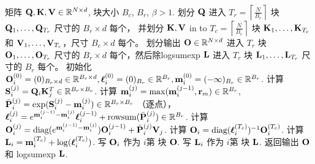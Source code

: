 \documentclass{article} %
\begin{document}
\begin{algorithm}[h!]
  \caption{通过缓解有偏舍入误差的稳定化 Flash Attention：前向过程}\label{alg:SFA}
  \begin{algorithmic}[1]
    \REQUIRE 矩阵 ${\mathbf{Q}}, {\mathbf{K}}, {\mathbf{V}} \in \mathbb{R}^{N \times d}$, 块大小 $B_c$, $B_r$, $\beta>1$.
    \STATE 划分 ${\mathbf{Q}}$ 进入 $T_r = \left\lceil\frac{N}{B_r} \right\rceil$ 块 ${\mathbf{Q}}_1, \dots, {\mathbf{Q}}_{T_r}$ 尺寸的 $B_r \times d$ 每个，
    并划分 ${\mathbf{K}}, {\mathbf{V}}$ in to $T_c = \left\lceil \frac{N}{B_c} \right\rceil$ 块 ${\mathbf{K}}_1, \dots, {\mathbf{K}}_{T_c}$ 和
    ${\mathbf{V}}_1, \dots, {\mathbf{V}}_{T_c}$，尺寸 $B_c \times d$ 每个。
    \STATE 划分输出 ${\mathbf{O}} \in \mathbb{R}^{N \times d}$ 进入 $T_r$ 块 ${\mathbf{O}}_1, \dots, {\mathbf{O}}_{T_r}$ 尺寸的
    $B_r \times d$ 每个，然后除logsumexp ${\mathbf{L}}$ 进入 $T_r$ 块 ${\mathbf{L}}_1, \dots, {\mathbf{L}}_{T_r}$ 尺寸的
    $B_r$ 每个。
      \STATE 初始化 ${\mathbf{O}}_{i}^{(0)} = (0)_{B_r \times d} \in \mathbb{R}^{B_r \times d}, {\boldsymbol{\ell}}_{i}^{(0)} = (0)_{B_r} \in \mathbb{R}^{B_r}, {\mathbf{m}}_{i}^{(0)} = (-\infty)_{B_r} \in \mathbb{R}^{B_r}$.
        \STATE 计算 ${\mathbf{S}}_{i}^{(j)} = {\mathbf{Q}}_i {\mathbf{K}}_j^T \in \mathbb{R}^{B_r \times B_c}$.
        \STATE 计算
        ${\mathbf{m}}_{i}^{(j)} = \mathrm{max}({\mathbf{m}}_{i}^{(j-1)}, {\mathbf{r}}_m) \in \mathbb{R}^{B_r}$, $\bar{{\mathbf{P}}}_{i}^{(j)} = \exp({\mathbf{S}}_{i}^{(j)} - {\mathbf{m}}_{i}^{(j)}) \in \mathbb{R}^{B_r \times B_c}$ （逐点），
        ${\boldsymbol{\ell}}_{i}^{(j)} = e^{{\mathbf{m}}_{i}^{(j-1)} - {\mathbf{m}}_{i}^{(j)}} {\boldsymbol{\ell}}_{i}^{(j-1)} + \mathrm{row sum}(\bar{{\mathbf{P}}}_{i}^{(j)}) \in \mathbb{R}^{B_r}$.
        \STATE 计算
        ${\mathbf{O}}_{i}^{(j)} = \text{diag}(e^{{\mathbf{m}}_{i}^{(j-1)} - {\mathbf{m}}_{i}^{(j)}}) {\mathbf{O}}_{i}^{(j-1)} + \bar{{\mathbf{P}}}_{i}^{(j)} {\mathbf{V}}_j$.
      \ENDFOR
      \STATE 计算 ${\mathbf{O}}_{i} = \text{diag}({\boldsymbol{\ell}}_{i}^{(T_c)})^{-1} {\mathbf{O}}_{i}^{(T_c)}$.
      \STATE 计算 ${\mathbf{L}}_{i} = {\mathbf{m}}_{i}^{(T_c)} + \log({\boldsymbol{\ell}}_{i}^{(T_c)})$.
      \STATE 写 ${\mathbf{O}}_{i}$ 作为 $i$第 块 ${\mathbf{O}}$.
      \STATE 写 ${\mathbf{L}}_{i}$ 作为 $i$第 块 ${\mathbf{L}}$.
    \ENDFOR
    \STATE 返回输出 ${\mathbf{O}}$ 和 logsumexp ${\mathbf{L}}$.
  \end{algorithmic}
\end{algorithm}
\end{document}
